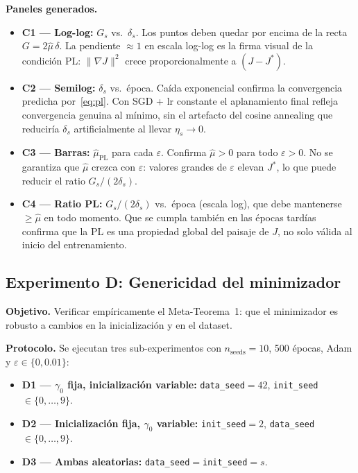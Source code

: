 \documentclass[11pt, a4paper]{article}
\theoremstyle{definition}
\begin{document}
\textbf{Paneles generados.}
\begin{itemize}
  \item \textbf{C1 — Log-log:} $G_s$ vs.\ $\delta_s$. Los puntos deben quedar
        por encima de la recta $G = 2\hat{\mu}\,\delta$. La pendiente $\approx 1$
        en escala log-log es la firma visual de la condición PL: $\|\nabla J\|^2$
        crece proporcionalmente a $(J - J^*)$.
  \item \textbf{C2 — Semilog:} $\delta_s$ vs.\ época. Caída exponencial
        confirma la convergencia predicha por~\eqref{eq:pl}. Con SGD + lr
        constante el aplanamiento final refleja convergencia genuina al mínimo,
        sin el artefacto del cosine annealing que reduciría $\delta_s$
        artificialmente al llevar $\eta_s \to 0$.
  \item \textbf{C3 — Barras:} $\hat{\mu}_{\text{PL}}$ para cada $\varepsilon$.
        Confirma $\hat{\mu} > 0$ para todo $\varepsilon > 0$. No se garantiza
        que $\hat{\mu}$ crezca con $\varepsilon$: valores grandes de $\varepsilon$
        elevan $J^*$, lo que puede reducir el ratio $G_s / (2\delta_s)$.
  \item \textbf{C4 — Ratio PL:} $G_s / (2\delta_s)$ vs.\ época (escala log),
        que debe mantenerse $\geq \hat{\mu}$ en todo momento. Que se cumpla
        también en las épocas tardías confirma que la PL es una propiedad
        global del paisaje de $J$, no solo válida al inicio del entrenamiento.
\end{itemize}

\subsection{Experimento D: Genericidad del minimizador}

\textbf{Objetivo.} Verificar empíricamente el Meta-Teorema~1: que el
minimizador es robusto a cambios en la inicialización y en el dataset.

\textbf{Protocolo.} Se ejecutan tres sub-experimentos con
$n_\text{seeds} = 10$, 500 épocas, Adam y $\varepsilon \in \{0, 0.01\}$:
\begin{itemize}
  \item \textbf{D1 — $\gamma_0$ fija, inicialización variable:}
        \texttt{data\_seed}$=42$, \texttt{init\_seed}$\in\{0,\ldots,9\}$.
  \item \textbf{D2 — Inicialización fija, $\gamma_0$ variable:}
        \texttt{init\_seed}$=2$, \texttt{data\_seed}$\in\{0,\ldots,9\}$.
  \item \textbf{D3 — Ambas aleatorias:}
        \texttt{data\_seed}$=$\texttt{init\_seed}$=s$.
\end{itemize}
\end{document}

